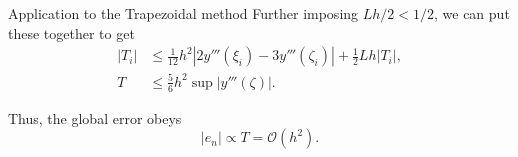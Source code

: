 \documentclass{beamer}
\begin{document}
    \begin{frame}{Application to the Trapezoidal method}
        Further imposing $Lh / 2 < 1 / 2$, we can put these together to get
        \begin{align*}
            |T_i| &\leq \frac{1}{12}h^2|2y'''(\xi_i) - 3y'''(\zeta_i)| +
            \frac{1}{2}Lh|T_i|, \\
            T & \leq \frac{5}{6}h^2 \sup|y'''(\zeta)|.
        \end{align*}
        
        Thus, the global error obeys \[
            |e_n| \propto T = \mathcal{O}(h^2).
        \] 
    \end{frame}
    
\end{document}
